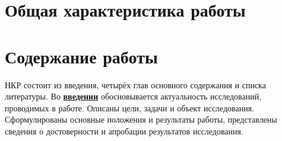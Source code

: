 \section*{Общая характеристика работы}

\newcommand{\actuality}{\pdfbookmark[1]{Актуальность}{actuality}\underline{\textbf{\actualityTXT}}}
\newcommand{\progress}{\pdfbookmark[1]{Разработанность темы}{progress}\underline{\textbf{\progressTXT}}}
\newcommand{\aim}{\pdfbookmark[1]{Цели}{aim}\underline{{\textbf\aimTXT}}}
\newcommand{\tasks}{\pdfbookmark[1]{Задачи}{tasks}\underline{\textbf{\tasksTXT}}}
\newcommand{\aimtasks}{\pdfbookmark[1]{Цели и задачи}{aimtasks}\aimtasksTXT}
\newcommand{\novelty}{\pdfbookmark[1]{Научная новизна}{novelty}\underline{\textbf{\noveltyTXT}}}
\newcommand{\influence}{\pdfbookmark[1]{Практическая значимость}{influence}\underline{\textbf{\influenceTXT}}}
\newcommand{\methods}{\pdfbookmark[1]{Методология и методы исследования}{methods}\underline{\textbf{\methodsTXT}}}
\newcommand{\defpositions}{\pdfbookmark[1]{Положения, выносимые на защиту}{defpositions}\underline{\textbf{\defpositionsTXT}}}
\newcommand{\reliability}{\pdfbookmark[1]{Достоверность}{reliability}\underline{\textbf{\reliabilityTXT}}}
\newcommand{\probation}{\pdfbookmark[1]{Апробация}{probation}\underline{\textbf{\probationTXT}}}
\newcommand{\contribution}{\pdfbookmark[1]{Личный вклад}{contribution}\underline{\textbf{\contributionTXT}}}
\newcommand{\publications}{\pdfbookmark[1]{Публикации}{publications}\underline{\textbf{\publicationsTXT}}}




\section*{Содержание работы}
НКР состоит из введения, четырёх глав основного содержания и списка литературы. 
Во \underline{\textbf{введении}} обосновывается актуальность
исследований, проводимых в работе. Описаны цели, задачи и объект исследования. 
Сформулированы основные положения и результаты работы,
представлены сведения о достоверности и апробации результатов исследования. 

